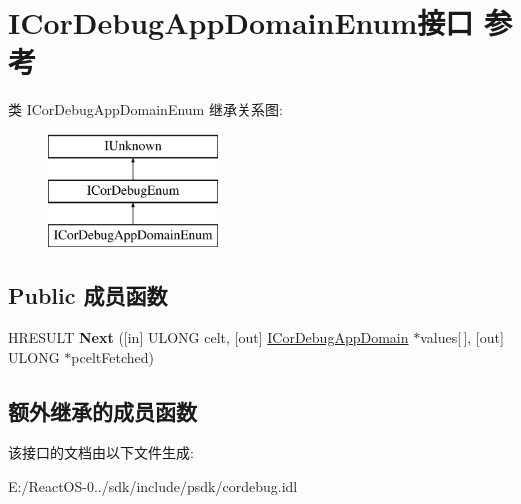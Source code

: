 \hypertarget{interface_i_cor_debug_app_domain_enum}{}\section{I\+Cor\+Debug\+App\+Domain\+Enum接口 参考}
\label{interface_i_cor_debug_app_domain_enum}
类 I\+Cor\+Debug\+App\+Domain\+Enum 继承关系图\+:\begin{figure}[H]
\begin{center}
\leavevmode
\includegraphics[height=3.000000cm]{interface_i_cor_debug_app_domain_enum}
\end{center}
\end{figure}
\subsection*{Public 成员函数}
\begin{DoxyCompactItemize}
\item 
\mbox{\label{interface_i_cor_debug_app_domain_enum_a644b5cd9a51b8c6ce57bb4e5c7defcfc}} 
H\+R\+E\+S\+U\+LT {\bfseries Next} (\mbox{[}in\mbox{]} U\+L\+O\+NG celt, \mbox{[}out\mbox{]} \hyperlink{interface_i_cor_debug_app_domain}{I\+Cor\+Debug\+App\+Domain} $\ast$values\mbox{[}$\,$\mbox{]}, \mbox{[}out\mbox{]} U\+L\+O\+NG $\ast$pcelt\+Fetched)
\end{DoxyCompactItemize}
\subsection*{额外继承的成员函数}


该接口的文档由以下文件生成\+:\begin{DoxyCompactItemize}
\item 
E\+:/\+React\+O\+S-\/0../sdk/include/psdk/cordebug.\+idl\end{DoxyCompactItemize}
